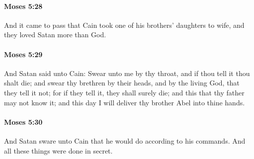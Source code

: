 		\paragraph{Moses 5:28} %
			\label{MOSES-5-28}

			And it came to pass that Cain took one of his brothers' daughters to wife, and they loved Satan more than God.


		\paragraph{Moses 5:29} %
			\label{MOSES-5-29}

			And Satan said unto Cain: Swear unto me by thy throat, and if thou tell it thou shalt die; and swear thy brethren by their heads, and by the living God, that they tell it not; for if they tell it, they shall surely die; and this that thy father may not know it; and this day I will deliver thy brother Abel into thine hands.


		\paragraph{Moses 5:30} %
			\label{MOSES-5-30}

			And Satan sware unto Cain that he would do according to his commands. And all these things were done in secret.


